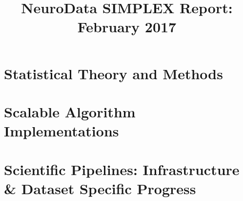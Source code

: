 \documentclass[12pt]{article}
\title{NeuroData SIMPLEX Report: February 2017}
\begin{document}

\newpage




\section{Statistical Theory and Methods}


%





%
%
%


\section{Scalable Algorithm Implementations}

%

%



\section{Scientific Pipelines: Infrastructure \& Dataset Specific
  Progress}


%






%
\end{document}
